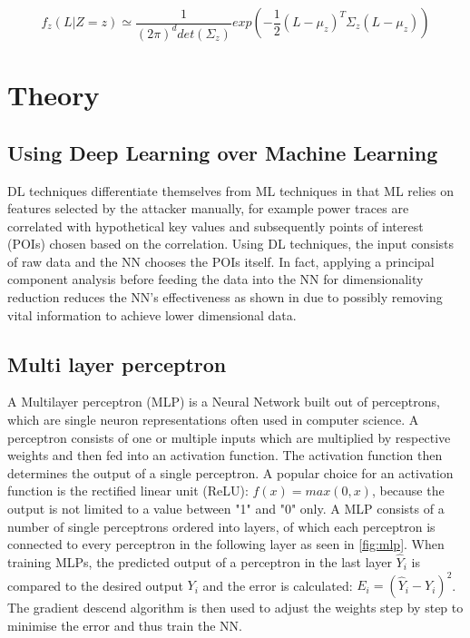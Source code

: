 \documentclass[journal]{IEEEtran}
\begin{document}
$$ f_z(L|Z=z) \simeq \dfrac{1}{(2\pi)^{d}det(\Sigma_z)}exp(-\frac{1}{2}(L-\mu_z)^{T}\Sigma_z(L-\mu_z)) $$


\section{Theory}
\subsection{Using Deep Learning over Machine Learning}
DL techniques differentiate themselves from ML techniques in that ML relies on features selected by the attacker manually, for example power traces are correlated with hypothetical key values and subsequently points of interest (POIs) chosen based on the correlation. Using DL techniques, the input consists of raw data and the NN chooses the POIs itself. In fact, applying a principal component analysis before feeding the data into the NN for dimensionality reduction reduces the NN's effectiveness as shown in \cite[p.~15]{breaking-crypto-dl:prouff} due to possibly removing vital information to achieve lower dimensional data.

\subsection{Multi layer perceptron}
\label{sc:mlp}
A Multilayer perceptron (MLP) is a Neural Network built out of perceptrons, which are single neuron representations often used in computer science. A perceptron consists of one or multiple inputs which are multiplied by respective weights and then fed into an activation function. The activation function then determines the output of a single perceptron. A popular choice for an activation function is the rectified linear unit (ReLU): $ f(x)=max(0, x) $, because the output is not limited to a value between "1" and "0" only. A MLP consists of a number of single perceptrons ordered into layers, of which each perceptron is connected to every perceptron in the following layer as seen in \autoref{fig:mlp}. When training MLPs, the predicted output of a perceptron in the last layer $ \hat{Y}_i $ is compared to the desired output $ Y_i $ and the error is calculated: $ E_i = (\hat{Y}_i - Y_i)^{2} $. The gradient descend algorithm is then used to adjust the weights step by step to minimise the error and thus train the NN.
\end{document}
